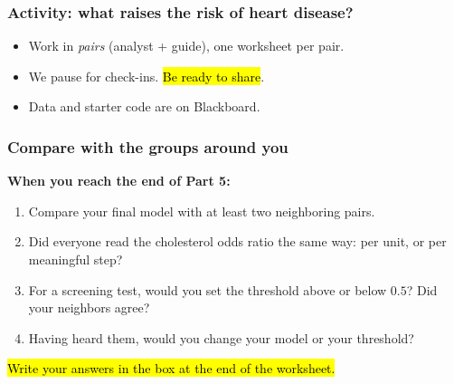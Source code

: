 \documentclass[slidestop,compress,mathserif]{beamer}
\begin{document}
\begin{frame}
\frametitle{Activity: what raises the risk of heart disease?}


\vspace{0.3em}
{\small
\begin{itemize}
\item Work in \emph{pairs} (analyst + guide), one worksheet per pair.
\item We pause for check-ins. \hl{Be ready to share}.
\item Data and starter code are on Blackboard.
\end{itemize}}

\end{frame}


\begin{frame}
\frametitle{Compare with the groups around you}

\textbf{When you reach the end of Part 5:}

\vspace{0.3em}
\begin{enumerate}
\item Compare your final model with at least two neighboring pairs.
\item Did everyone read the cholesterol odds ratio the same way: per unit, or per meaningful step?
\item For a screening test, would you set the threshold above or below $0.5$? Did your neighbors agree?
\item Having heard them, would you change your model or your threshold?
\end{enumerate}

\vspace{0.5em}
\hl{Write your answers in the box at the end of the worksheet.}

\end{frame}


\end{document}
